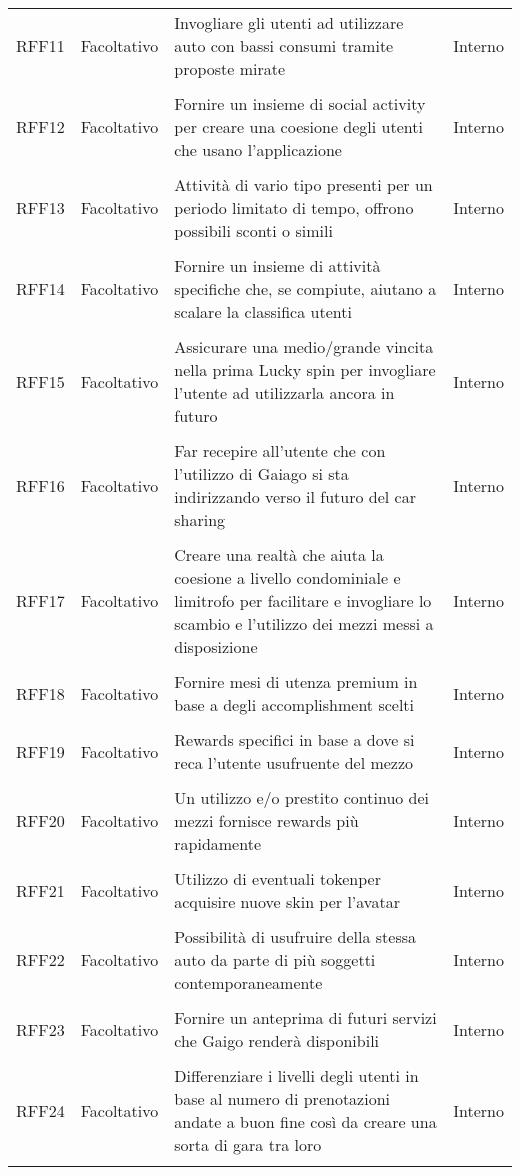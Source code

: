 \begin{longtable}{ >{\centering}p{} >{\centering}p{}
		>{\raggedright}p{} >{\centering}p{}}
	RFF11	&	Facoltativo	&	Invogliare gli utenti ad utilizzare auto con bassi consumi tramite proposte mirate &	Interno  \\ 	\tabularnewline
	RFF12	&	Facoltativo	&	Fornire un insieme di social activity per creare una coesione degli utenti che usano l'applicazione &	Interno  \\ 	\tabularnewline
	RFF13	&	Facoltativo	&	Attività di vario tipo presenti per un periodo limitato di tempo, offrono possibili sconti o simili &	Interno  \\	\tabularnewline
	RFF14	&	Facoltativo	& Fornire un insieme di attività specifiche che, se compiute, aiutano a scalare la classifica utenti &	Interno  \\ 	\tabularnewline
	RFF15	&	Facoltativo	& Assicurare una medio/grande vincita nella prima Lucky spin per invogliare l'utente ad utilizzarla ancora in futuro &	Interno  \\ 	\tabularnewline
	RFF16	&	Facoltativo	& Far recepire all'utente che con l'utilizzo di Gaiago si sta indirizzando verso il futuro del car sharing &	Interno  \\ 	\tabularnewline
	RFF17	&	Facoltativo	& Creare una realtà che aiuta la coesione a livello condominiale e limitrofo per facilitare e invogliare lo scambio e l'utilizzo dei mezzi messi a disposizione &	Interno  \\ 	\tabularnewline
	RFF18	&	Facoltativo	& Fornire mesi di utenza premium in base a degli accomplishment scelti &	Interno  \\ 	\tabularnewline
	RFF19	&	Facoltativo	& Rewards specifici in base a dove si reca l'utente usufruente del mezzo &	Interno  \\ 	\tabularnewline
	RFF20	&	Facoltativo	& Un utilizzo e/o prestito continuo dei mezzi fornisce rewards più rapidamente &	Interno  \\ 	\tabularnewline
	RFF21	&	Facoltativo	& Utilizzo di eventuali token\glosp per acquisire nuove skin per l'avatar  &	Interno  \\ 	\tabularnewline
	RFF22	&	Facoltativo	& Possibilità di usufruire della stessa auto da parte di più soggetti contemporaneamente  &	Interno  \\ 	\tabularnewline
	RFF23	&	Facoltativo	& Fornire un anteprima di futuri servizi che Gaigo renderà disponibili  &	Interno  \\ 	\tabularnewline
	RFF24	&	Facoltativo	& Differenziare i livelli degli utenti in base al numero di prenotazioni andate a buon fine così da creare una sorta di gara tra loro  &	Interno  \\ 	\tabularnewline

\end{longtable}
